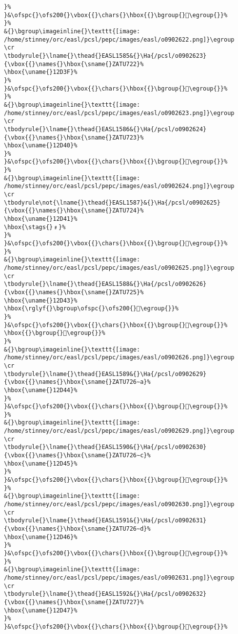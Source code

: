 \begin{verbatim}
}%
}&\ofspc{}\ofs200{}\vbox{{}\chars{}\hbox{{}\bgroup{}𒴾\egroup{}}%
}%
&{}\bgroup\imageinline{}\texttt{[image: /home/stinney/orc/easl/pcsl/pepc/images/easl/o0902622.png]}\egroup
\cr
\tbodyrule{}\lname{}\thead{}EASL1585&{}\Ha{/pcsl/o0902623}{\vbox{{}\names{}\hbox{\sname{}ZATU722}%
\hbox{\uname{}12D3F}%
}%
}&\ofspc{}\ofs200{}\vbox{{}\chars{}\hbox{{}\bgroup{}𒴿\egroup{}}%
}%
&{}\bgroup\imageinline{}\texttt{[image: /home/stinney/orc/easl/pcsl/pepc/images/easl/o0902623.png]}\egroup
\cr
\tbodyrule{}\lname{}\thead{}EASL1586&{}\Ha{/pcsl/o0902624}{\vbox{{}\names{}\hbox{\sname{}ZATU723}%
\hbox{\uname{}12D40}%
}%
}&\ofspc{}\ofs200{}\vbox{{}\chars{}\hbox{{}\bgroup{}𒵀\egroup{}}%
}%
&{}\bgroup\imageinline{}\texttt{[image: /home/stinney/orc/easl/pcsl/pepc/images/easl/o0902624.png]}\egroup
\cr
\tbodyrule\not{\lname{}\thead{}EASL1587}&{}\Ha{/pcsl/o0902625}{\vbox{{}\names{}\hbox{\sname{}ZATU724}%
\hbox{\uname{}12D41}%
\hbox{\stags{}﹟}%
}%
}&\ofspc{}\ofs200{}\vbox{{}\chars{}\hbox{{}\bgroup{}𒵁\egroup{}}%
}%
&{}\bgroup\imageinline{}\texttt{[image: /home/stinney/orc/easl/pcsl/pepc/images/easl/o0902625.png]}\egroup
\cr
\tbodyrule{}\lname{}\thead{}EASL1588&{}\Ha{/pcsl/o0902626}{\vbox{{}\names{}\hbox{\sname{}ZATU725}%
\hbox{\uname{}12D43}%
\hbox{\rglyf{}\bgroup\ofspc{}\ofs200{}𒵃\egroup{}}%
}%
}&\ofspc{}\ofs200{}\vbox{{}\chars{}\hbox{{}\bgroup{}𒵂\egroup{}}%
\hbox{{}\bgroup{}𒵃\egroup{}}%
}%
&{}\bgroup\imageinline{}\texttt{[image: /home/stinney/orc/easl/pcsl/pepc/images/easl/o0902626.png]}\egroup
\cr
\tbodyrule{}\lname{}\thead{}EASL1589&{}\Ha{/pcsl/o0902629}{\vbox{{}\names{}\hbox{\sname{}ZATU726∼a}%
\hbox{\uname{}12D44}%
}%
}&\ofspc{}\ofs200{}\vbox{{}\chars{}\hbox{{}\bgroup{}𒵄\egroup{}}%
}%
&{}\bgroup\imageinline{}\texttt{[image: /home/stinney/orc/easl/pcsl/pepc/images/easl/o0902629.png]}\egroup
\cr
\tbodyrule{}\lname{}\thead{}EASL1590&{}\Ha{/pcsl/o0902630}{\vbox{{}\names{}\hbox{\sname{}ZATU726∼c}%
\hbox{\uname{}12D45}%
}%
}&\ofspc{}\ofs200{}\vbox{{}\chars{}\hbox{{}\bgroup{}𒵅\egroup{}}%
}%
&{}\bgroup\imageinline{}\texttt{[image: /home/stinney/orc/easl/pcsl/pepc/images/easl/o0902630.png]}\egroup
\cr
\tbodyrule{}\lname{}\thead{}EASL1591&{}\Ha{/pcsl/o0902631}{\vbox{{}\names{}\hbox{\sname{}ZATU726∼d}%
\hbox{\uname{}12D46}%
}%
}&\ofspc{}\ofs200{}\vbox{{}\chars{}\hbox{{}\bgroup{}𒵆\egroup{}}%
}%
&{}\bgroup\imageinline{}\texttt{[image: /home/stinney/orc/easl/pcsl/pepc/images/easl/o0902631.png]}\egroup
\cr
\tbodyrule{}\lname{}\thead{}EASL1592&{}\Ha{/pcsl/o0902632}{\vbox{{}\names{}\hbox{\sname{}ZATU727}%
\hbox{\uname{}12D47}%
}%
}&\ofspc{}\ofs200{}\vbox{{}\chars{}\hbox{{}\bgroup{}𒵇\egroup{}}%

\end{verbatim}
